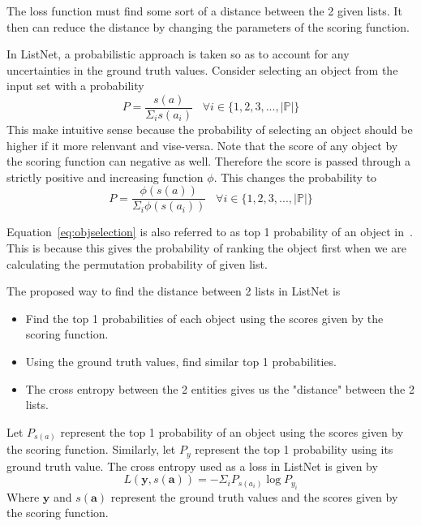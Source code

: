\documentclass[12pt, twoside, ngerman]{report}
\begin{document}
The loss function must find some sort of a distance between the 2 given lists.
It then can reduce the distance by changing the parameters of the scoring function.

In ListNet,  a probabilistic approach is taken so as to account for any uncertainties in the ground truth values.
Consider selecting an object from the input set with a probability
$$
P = \frac{s(a)}{\Sigma_i s(a_i)} \;\;\; \forall i \in \{1, 2, 3, ...,  |\mathbb{P}|\}
$$
This make intuitive sense because the probability of selecting an object should be higher if it more relenvant and vise-versa.
Note that the score of any object by the scoring function can negative as well.
Therefore the score is passed through a strictly positive and increasing function $\phi$.
This changes the probability to
\begin{equation}\label{eq:objselection}
P = \frac{\phi(s(a))}{\Sigma_i \phi(s(a_i))} \;\;\; \forall i \in \{1, 2, 3, ...,  |\mathbb{P}|\}
\end{equation}

Equation~\ref{eq:objselection} is also referred to as top 1 probability of an object in~\cite{listwisebetter}.
This is because this gives the probability of ranking the object first when we are calculating the permutation probability of given list.

The proposed way to find the distance between 2 lists in ListNet is
\begin{itemize}
\item Find the top 1 probabilities of each object using the scores given by the scoring function.
\item Using the ground truth values,  find similar top 1 probabilities.
\item The cross entropy between the 2 entities gives us the "distance" between the 2 lists.
\end{itemize}

Let $P_{s(a)}$ represent the top 1 probability of an object using the scores given by the scoring function.
Similarly,   let $P_y$ represent the top 1 probability using its ground truth value.
The cross entropy used as a loss in ListNet is given by
\begin{equation}
L(\textbf{y},  {s(\textbf{a})}) = - \Sigma_i P_{s(a_i)} \log P_{y_i}
\end{equation}
Where $\textbf{y}$ and $s(\textbf{a})$ represent the ground truth values and the scores given by the scoring function.

\iffalse
\end{document}
